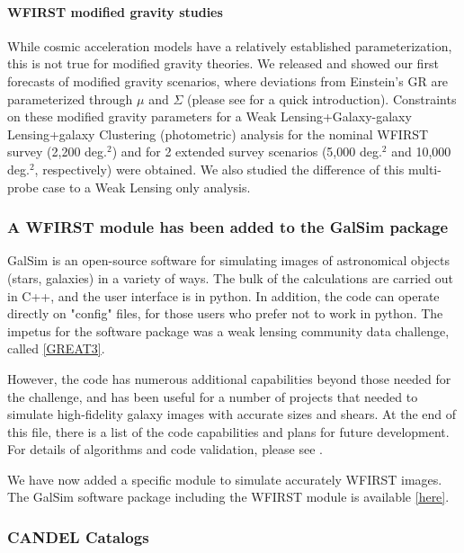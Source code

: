 \paragraph{WFIRST modified gravity studies} While cosmic acceleration models have a relatively established parameterization, this is not true for modified gravity theories. We released and showed our first forecasts of modified gravity scenarios, where deviations from Einstein’s GR are parameterized through $\mu$ and $\Sigma$ (please see \citet{Joyce:2016vqv} for a quick introduction). Constraints on these modified gravity parameters for a Weak Lensing+Galaxy-galaxy Lensing+galaxy Clustering (photometric) analysis for the nominal WFIRST survey (2,200 deg.$^2$) and for 2 extended survey scenarios (5,000 deg.$^2$ and 10,000 deg.$^2$, respectively) were obtained. We also studied the difference of this multi-probe case to a Weak Lensing only analysis.

\subsubsection{A WFIRST module has been added to the GalSim package}

GalSim is an open-source software for simulating images of astronomical objects (stars, galaxies) in a variety of ways. The bulk of the calculations are carried out in C++, and the user interface is in python. In addition, the code can operate directly on "config" files, for those users who prefer not to work in python. The impetus for the software package was a weak lensing community data challenge, called \href{http://great3challenge.info/}{[GREAT3]}.

However, the code has numerous additional capabilities beyond those needed for the challenge, and has been useful for a number of projects that needed to simulate high-fidelity galaxy images with accurate sizes and shears. At the end of this file, there is a list of the code capabilities and plans for future development. For details of algorithms and code validation, please see \citet{Rowe2015}.

We have now added a specific module to simulate accurately WFIRST images. The GalSim software package including the WFIRST module is available \href{http://galsim-developers.github.io/GalSim/index.html}{[here]}.

\subsubsection{CANDEL Catalogs}

